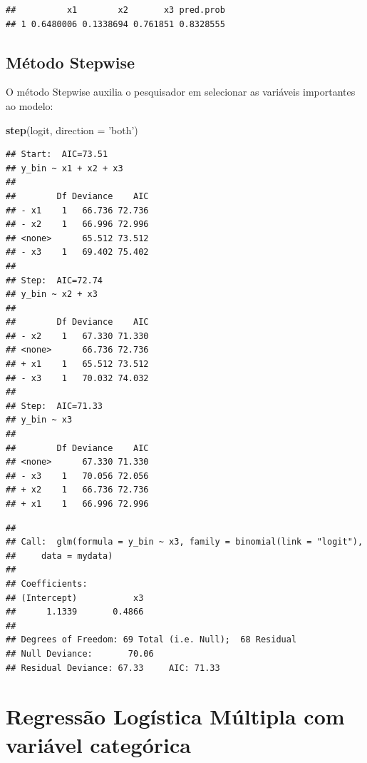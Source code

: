 \documentclass[12pt,brazil,]{book}
\newenvironment{Shaded}{\begin{snugshade}}{\end{snugshade}}
\newcommand{\DataTypeTok}[1]{\textcolor[rgb]{0.13,0.29,0.53}{#1}}
\newcommand{\KeywordTok}[1]{\textcolor[rgb]{0.13,0.29,0.53}{\textbf{#1}}}
\newcommand{\NormalTok}[1]{#1}
\newcommand{\StringTok}[1]{\textcolor[rgb]{0.31,0.60,0.02}{#1}}
\begin{document}
\begin{verbatim}
##          x1        x2       x3 pred.prob
## 1 0.6480006 0.1338694 0.761851 0.8328555
\end{verbatim}

\hypertarget{metodo-stepwise}{%
\subsection{Método Stepwise}\label{metodo-stepwise}}

O método Stepwise auxilia o pesquisador em selecionar as variáveis
importantes ao modelo:

\begin{Shaded}
\begin{Highlighting}[]
\KeywordTok{step}\NormalTok{(logit, }\DataTypeTok{direction =} \StringTok{'both'}\NormalTok{)}
\end{Highlighting}
\end{Shaded}

\begin{verbatim}
## Start:  AIC=73.51
## y_bin ~ x1 + x2 + x3
## 
##        Df Deviance    AIC
## - x1    1   66.736 72.736
## - x2    1   66.996 72.996
## <none>      65.512 73.512
## - x3    1   69.402 75.402
## 
## Step:  AIC=72.74
## y_bin ~ x2 + x3
## 
##        Df Deviance    AIC
## - x2    1   67.330 71.330
## <none>      66.736 72.736
## + x1    1   65.512 73.512
## - x3    1   70.032 74.032
## 
## Step:  AIC=71.33
## y_bin ~ x3
## 
##        Df Deviance    AIC
## <none>      67.330 71.330
## - x3    1   70.056 72.056
## + x2    1   66.736 72.736
## + x1    1   66.996 72.996
\end{verbatim}

\begin{verbatim}
## 
## Call:  glm(formula = y_bin ~ x3, family = binomial(link = "logit"), 
##     data = mydata)
## 
## Coefficients:
## (Intercept)           x3  
##      1.1339       0.4866  
## 
## Degrees of Freedom: 69 Total (i.e. Null);  68 Residual
## Null Deviance:       70.06 
## Residual Deviance: 67.33     AIC: 71.33
\end{verbatim}

\hypertarget{regressao-logistica-multipla-com-variavel-categorica}{%
\section{Regressão Logística Múltipla com variável
categórica}\label{regressao-logistica-multipla-com-variavel-categorica}}
\end{document}

